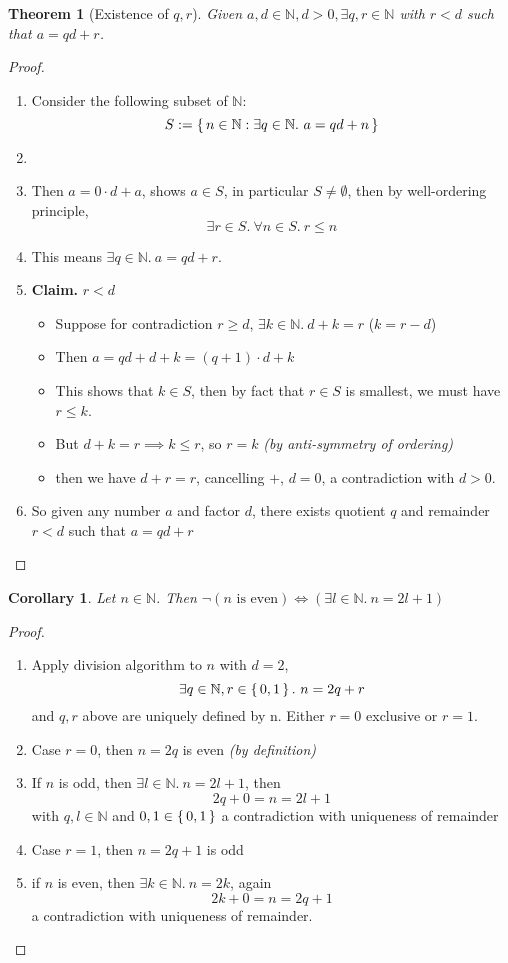 \documentclass[12pt]{article}
\newenvironment{prf}
{
    \begin{proof}
        \hfill
        \begin{enumerate}[label*=\arabic*.]
                }
                {
                \hfill\qedsymbol
        \end{enumerate}
    \renewcommand{\qedsymbol}{}
    \end{proof}
}
\newcounter{dummy} \numberwithin{dummy}{section}
\numberwithin{equation}{dummy}
\newtheorem*{dummythm}{Theorem}
\newtheorem{cor}[dummy]{Corollary}
\theoremstyle{definition}
\newcommand{\nat}{\mathbb{N}}
\newcommand{\by}[1]{\hfill \emph{(by #1)}}
\begin{document}
\newpage
\begin{dummythm}[Existence of $q,r$]
    Given $a,d\in\nat, d>0, \exists q,r \in \nat$ with $r<d$ such that $a = qd+r$.
\end{dummythm}
\begin{prf}
\item Consider the following subset of $\nat$:
    $$S := \set{n\in\nat: \exists q\in\nat.~ a = qd + n}$$
\item[] [($S$ consists of all natural numbers of form $a - q\cdot d$ for various choices of $q$)]
\item Then $a = 0\cdot d + a$, shows $a \in S$, in particular $S \ne \emptyset$, then by well-ordering principle,
    $$\exists r\in S.~\forall n\in S.~ r\leq n$$
\item This means $\exists q \in \nat.~ a = qd + r$.
    \item[] \textbf{Claim.} $r<d$
    \begin{itemize}
        \item Suppose for contradiction $r \geq d$, $\exists k \in \nat.~ d+k=r$ \hfill($k=r-d$)
        \item Then $a = qd +d  + k = (q+1)\cdot d + k$
        \item This shows that $k\in S$, then by fact that $r\in S$ is smallest, we must have $r \leq k$.
        \item But $d + k = r \implies k \leq r$, so $r = k$ \by{anti-symmetry of ordering}
        \item then we have $d+r=r$, cancelling $+$, $d=0$, a contradiction with $d>0$.
    \end{itemize}
\item So given any number $a$ and factor $d$, there exists quotient $q$ and remainder $r < d$ such that $a = qd + r$
\end{prf}

\begin{cor}
    Let $n\in\nat$. Then $\lnot(n \text{ is even}) \iff (\exists l \in \nat.~ n=2l+1)$
\end{cor}
\begin{prf}
\item Apply division algorithm to $n$ with $d=2$,
    $$\exists q \in \nat, r \in \set{0,1}.~ n = 2q+r$$
    and $q,r$ above are uniquely defined by n. Either $r=0$ exclusive or $r=1$.
\item Case $r=0$, then $n=2q$ is even \by{definition}
\item If $n$ is odd, then $\exists l \in \nat.~ n = 2l +1$, then
    $$2q + 0 = n = 2l + 1$$ with $q,l\in\nat$ and $0,1 \in \set{0,1}$
        a contradiction with uniqueness of remainder
\item Case $r=1$, then $n=2q+1$ is odd
\item if $n$ is even, then $\exists k\in\nat.~ n=2k$, again
    $$2k + 0 = n = 2q + 1$$ a contradiction with uniqueness of remainder.
\end{prf}
\end{document}
